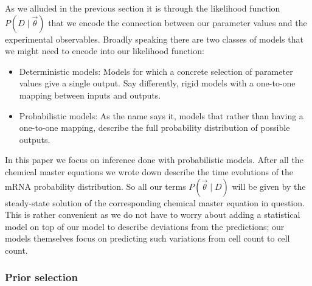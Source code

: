 
As we alluded in the previous section it is through the likelihood function 
$P(D \mid \vec{\theta})$ that we encode the connection between our parameter 
values and the experimental observables. Broadly speaking there are two classes
of models that we might need to encode into our likelihood function:
\begin{itemize}
        \item Deterministic models: Models for which a concrete selection of
        parameter values give a single output. Say differently, rigid models 
        with a one-to-one mapping between inputs and outputs.
        \item Probabilistic models: As the name says it, models that rather than
        having a one-to-one mapping, describe the full probability distribution
        of possible outputs.
\end{itemize}
In this paper we focus on inference done with probabilistic models. After all
the chemical master equations we wrote down describe the time evolutions of the
mRNA probability distribution. So all our terms $P(\vec{\theta} \mid D)$ will 
be given by the steady-state solution of the corresponding chemical master 
equation in question. This is rather convenient as we do not have to worry about
adding a statistical model on top of our model to describe deviations from the
predictions; our models themselves focus on predicting such variations from 
cell count to cell count.

\subsubsection{Prior selection}


